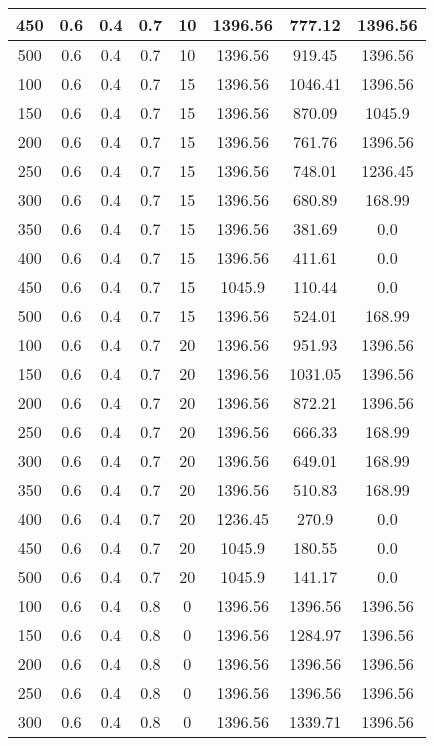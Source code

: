 \documentclass[a4paper, 12pt]{extreport}
\begin{document}
\begin{itemize}
\begin{longtable}{|c|c|c|c|c|c|c|c|}
			450 & 0.6 & 0.4 & 0.7 & 10 & 1396.56 & 777.12 & 1396.56 \\\hline
			500 & 0.6 & 0.4 & 0.7 & 10 & 1396.56 & 919.45 & 1396.56 \\\hline
			100 & 0.6 & 0.4 & 0.7 & 15 & 1396.56 & 1046.41 & 1396.56 \\\hline
			150 & 0.6 & 0.4 & 0.7 & 15 & 1396.56 & 870.09 & 1045.9 \\\hline
			200 & 0.6 & 0.4 & 0.7 & 15 & 1396.56 & 761.76 & 1396.56 \\\hline
			250 & 0.6 & 0.4 & 0.7 & 15 & 1396.56 & 748.01 & 1236.45 \\\hline
			300 & 0.6 & 0.4 & 0.7 & 15 & 1396.56 & 680.89 & 168.99 \\\hline
			350 & 0.6 & 0.4 & 0.7 & 15 & 1396.56 & 381.69 & 0.0 \\\hline
			400 & 0.6 & 0.4 & 0.7 & 15 & 1396.56 & 411.61 & 0.0 \\\hline
			450 & 0.6 & 0.4 & 0.7 & 15 & 1045.9 & 110.44 & 0.0 \\\hline
			500 & 0.6 & 0.4 & 0.7 & 15 & 1396.56 & 524.01 & 168.99 \\\hline
			100 & 0.6 & 0.4 & 0.7 & 20 & 1396.56 & 951.93 & 1396.56 \\\hline
			150 & 0.6 & 0.4 & 0.7 & 20 & 1396.56 & 1031.05 & 1396.56 \\\hline
			200 & 0.6 & 0.4 & 0.7 & 20 & 1396.56 & 872.21 & 1396.56 \\\hline
			250 & 0.6 & 0.4 & 0.7 & 20 & 1396.56 & 666.33 & 168.99 \\\hline
			300 & 0.6 & 0.4 & 0.7 & 20 & 1396.56 & 649.01 & 168.99 \\\hline
			350 & 0.6 & 0.4 & 0.7 & 20 & 1396.56 & 510.83 & 168.99 \\\hline
			400 & 0.6 & 0.4 & 0.7 & 20 & 1236.45 & 270.9 & 0.0 \\\hline
			450 & 0.6 & 0.4 & 0.7 & 20 & 1045.9 & 180.55 & 0.0 \\\hline
			500 & 0.6 & 0.4 & 0.7 & 20 & 1045.9 & 141.17 & 0.0 \\\hline
			100 & 0.6 & 0.4 & 0.8 & 0 & 1396.56 & 1396.56 & 1396.56 \\\hline
			150 & 0.6 & 0.4 & 0.8 & 0 & 1396.56 & 1284.97 & 1396.56 \\\hline
			200 & 0.6 & 0.4 & 0.8 & 0 & 1396.56 & 1396.56 & 1396.56 \\\hline
			250 & 0.6 & 0.4 & 0.8 & 0 & 1396.56 & 1396.56 & 1396.56 \\\hline
			300 & 0.6 & 0.4 & 0.8 & 0 & 1396.56 & 1339.71 & 1396.56 \\\hline

\end{longtable}
\end{itemize}
\end{document}
